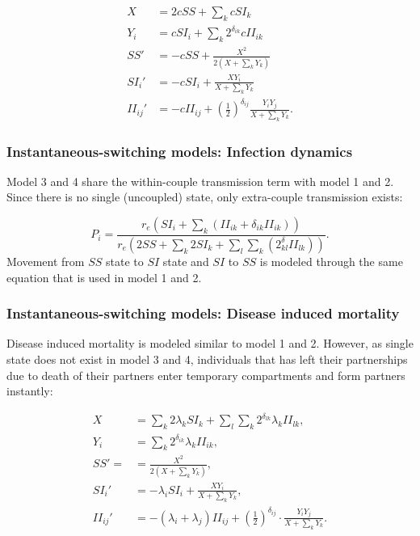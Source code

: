\documentclass[10pt,letterpaper]{article}
\newcommand{\khalf}{\left(\frac{1}{2}\right)^{\delta_{ij}}}  %
\begin{document}
\begin{equation}
\begin{aligned}
X &= 2 c SS + \sum_k c SI_k \\
Y_i &= c SI_i + \sum_k 2^{\delta_{ik}} c II_{ik} \\
SS' &= - c SS + \frac{X^2}{2 (X + \sum_k Y_k)}\\
SI_i' &= - c SI_i + \frac{X Y_i}{X + \sum_k Y_k}\\
II_{ij}' &= - c II_{ij} +\khalf \frac{Y_i Y_j}{X + \sum_k Y_k}.
\end{aligned}
\end{equation}

\subsubsection*{Instantaneous-switching models: Infection dynamics}

Model 3 and 4 share the within-couple transmission term with model 1 and 2. Since there is no single (uncoupled) state, only extra-couple transmission exists:

\begin{equation}
P_i = \frac{r_e (SI_i + \sum_k (II_{ik} + \delta_{ik} II_{ik}))}{r_e(2 SS + \sum_k 2 SI_k + \sum_l \sum_k (2^\delta_{kl} II_{lk}) )}.
\end{equation}
Movement from $SS$ state to $SI$ state and $SI$ to $SS$ is modeled through the same equation that is used in model 1 and 2.

\subsubsection*{Instantaneous-switching models: Disease induced mortality}

Disease induced mortality is modeled similar to model 1 and 2. However, as single state does not exist in model 3 and 4, individuals that has left their partnerships due to death of their partners enter temporary compartments and form partners instantly:

\begin{equation}
\begin{aligned}
X &= \sum_k 2 \lambda_k SI_k + \sum_l \sum_k 2^{\delta_{lk}}  \lambda_k II_{lk}, \\
Y_i &=  \sum_k  2^{\delta_{ik}}  \lambda_k II_{ik}, \\
SS' = &= \frac{X^2}{2 (X + \sum_k Y_k)},\\
SI_i' &= - \lambda_i SI_i + \frac{X Y_i}{X + \sum_k Y_k},\\
II_{ij}' &= -(\lambda_i + \lambda_j) II_{ij} + \khalf \cdot \frac{Y_i Y_j}{X + \sum_k Y_k}.
\end{aligned}
\end{equation}
\end{document}
